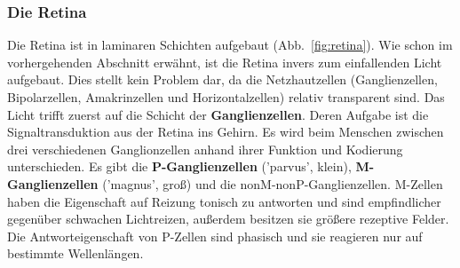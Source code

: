 \documentclass[12pt,a4paper,pdftex]{article}
\begin{document}
\subsubsection*{Die Retina}


Die Retina ist in laminaren Schichten aufgebaut (Abb.~\ref{fig:retina}).
Wie schon im vorhergehenden Abschnitt erwähnt, ist die Retina invers zum einfallenden Licht aufgebaut. Dies stellt kein Problem dar, da die Netzhautzellen (Ganglienzellen, Bipolarzellen, Amakrinzellen und Horizontalzellen) relativ transparent sind. Das Licht trifft zuerst auf die Schicht der \textbf{Ganglienzellen}.  Deren Aufgabe ist die Signaltransduktion aus der Retina ins Gehirn. Es wird beim Menschen zwischen drei verschiedenen Ganglionzellen anhand ihrer Funktion und Kodierung unterschieden. Es gibt die \textbf{P-Ganglienzellen}  ('parvus', klein), \textbf{M-Ganglienzellen}  ('magnus', groß) und die nonM-nonP-Ganglienzellen. 
M-Zellen haben die Eigenschaft auf Reizung tonisch zu antworten und sind empfindlicher gegenüber schwachen Lichtreizen, außerdem besitzen sie größere rezeptive Felder. Die Antworteigenschaft von P-Zellen sind phasisch und sie reagieren nur auf bestimmte Wellenlängen. 
\end{document}
